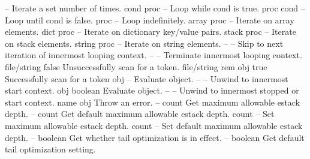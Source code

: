 \begin{longtable}{}
	{--}
	{Iterate a set number of times.}
\hline
\optableent
	{cond proc}
	{{\bf {}}}
	{--}
	{ Loop while cond is true.}
\hline
\optableent
	{proc cond}
	{{\bf {}}}
	{--}
	{ Loop until cond is false.}
\hline
\optableent
	{proc}
	{{\bf {}}}
	{--}
	{ Loop indefinitely.}
\hline
\optableent
	{array proc}
	{{\bf {}}}
	{--}
	{Iterate on array elements.}
\optableent
	{dict proc}
	{{\bf {}}}
	{--}
	{Iterate on dictionary key/value pairs.}
\optableent
	{stack proc}
	{{\bf {}}}
	{--}
	{Iterate on stack elements.}
\optableent
	{string proc}
	{{\bf {}}}
	{--}
	{Iterate on string elements.}
\hline
\optableent
	{--}
	{{\bf {}}}
	{--}
	{Skip to next iteration of innermost looping context.}
\hline
\optableent
	{--}
	{{\bf {}}}
	{--}
	{Terminate innermost looping context.}
\hline
\optableent
	{file/string}
	{{\bf {}}}
	{false}
	{Unsuccessfully scan for a token.}
\optableent
	{file/string}
	{{\bf {}}}
	{rem obj true}
	{Successfully scan for a token}
\hline
\optableent
	{obj}
	{{\bf {}}}
	{--}
	{Evaluate object.}
\hline
\optableent
	{--}
	{{\bf {}}}
	{--}
	{Unwind to innermost start context.}
\hline
\optableent
	{obj}
	{{\bf {}}}
	{boolean}
	{Evaluate object.}
\hline
\optableent
	{--}
	{{\bf {}}}
	{--}
	{Unwind to innermost stopped or start context.}
\hline
\optableent
	{name}
	{{\bf {}}}
	{obj}
	{Throw an error.}
\hline
\optableent
	{--}
	{{\bf {}}}
	{count}
	{Get maximum allowable estack depth.}
\hline
\optableent
	{--}
	{{\bf {}}}
	{count}
	{Get default maximum allowable estack depth.}
\hline
\optableent
	{count}
	{{\bf {}}}
	{--}
	{Set maximum allowable estack depth.}
\hline
\optableent
	{count}
	{{\bf {}}}
	{--}
	{Set default maximum allowable estack depth.}
\hline
\optableent
	{--}
	{{\bf {}}}
	{boolean}
	{Get whether tail optimization is in effect.}
\hline
\optableent
	{--}
	{{\bf {}}}
	{boolean}
	{Get default tail optimization setting.}

\end{longtable}

